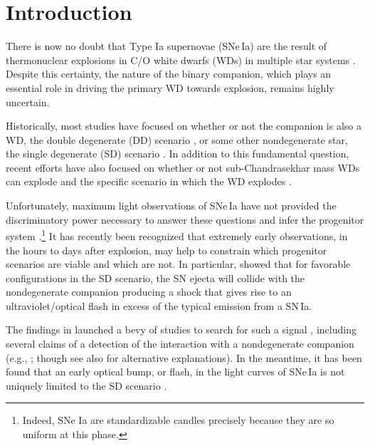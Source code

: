 \documentclass[twocolumn]{aastex63}
\begin{document}
\section{Introduction}

There is now no doubt that Type Ia supernovae (SNe\,Ia) are the result of
thermonuclear explosions in C/O white dwarfs (WDs) in multiple star systems
\citep[see e.g.,][and references therein]{Maoz14}. Despite this certainty, the 
nature of the binary companion, which plays an essential role in driving the
primary WD towards explosion, remains highly uncertain.

Historically, most studies have focused on whether or not the companion is
also a WD, the double degenerate (DD) scenario \citep[e.g.,][]{Webbink84}, or
some other nondegenerate star, the single degenerate (SD) scenario
\citep[e.g.,][]{Whelan73}. In addition to this fundamental question, recent
efforts have also focused on whether or not sub-Chandrasekhar mass WDs can
explode \citep[e.g.,][]{Fink10,Shen14,Scalzo14a,Polin19,Gronow20} and the
specific scenario in which the WD explodes \citep[see][and references
therein]{Hillebrandt13,Ropke18}.

Unfortunately, maximum light observations of SNe\,Ia have not provided the
discriminatory power necessary to answer these questions and infer the
progenitor system \citep[e.g.,][]{Ropke12}.\footnote{Indeed, SNe Ia are
standardizable candles precisely because they are so uniform at this phase.}
It has recently been recognized that extremely early observations, in the
hours to days after explosion, may help to constrain which progenitor
scenarios are viable and which are not. In particular, \citet{Kasen10a} showed
that for favorable configurations in the SD scenario, the SN ejecta will
collide with the nondegenerate companion producing a shock that gives rise to
an ultraviolet/optical flash in excess of the typical emission from a SN\,Ia.

The findings in \citet{Kasen10a} launched a bevy of studies to search for such
a signal \citep[e.g.,][]{Hayden10,Ganeshalingam11,Bianco11,Nugent11,Olling15},
including several claims of a detection of the interaction with a
nondegenerate companion (e.g.,
\citealt{Cao15,Marion16,Hosseinzadeh17,Dimitriadis19}; though see also
\citealt{Kromer16,Shappee18,Shappee19,Jiang18} for alternative explanations).
In the meantime, it has been found that an early optical bump, or flash, in
the light curves of SNe\,Ia is not uniquely limited to the SD scenario
\citep[e.g.,][]{Raskin13,Piro16,Levanon17,Noebauer17,Jiang17,Maeda18,Polin19,
De19,Magee20a}.
\end{document}
